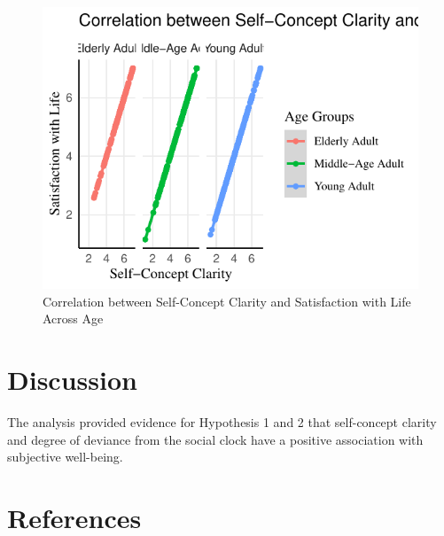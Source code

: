 \documentclass[
  man,floatsintext]{apa6}
\begin{document}
\begin{figure}
\centering
\includegraphics{x_files/figure-latex/SCCtoSWL-1.pdf}
\caption{\label{fig:SCCtoSWL}Correlation between Self-Concept Clarity and Satisfaction with Life Across Age}
\end{figure}

\hypertarget{discussion}{%
\section{Discussion}\label{discussion}}

The analysis provided evidence for Hypothesis 1 and 2 that self-concept clarity and degree of deviance from the social clock have a positive association with subjective well-being.

\newpage

\hypertarget{references}{%
\section{References}\label{references}}
\end{document}
